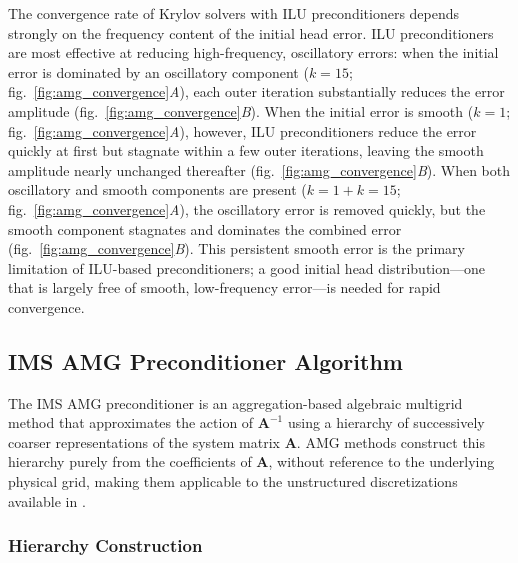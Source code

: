 The convergence rate of Krylov solvers with ILU preconditioners depends strongly on the frequency content of the initial head error. ILU preconditioners are most effective at reducing high-frequency, oscillatory errors: when the initial error is dominated by an oscillatory component ($k = 15$; fig.~\ref{fig:amg_convergence}\textit{A}), each outer iteration substantially reduces the error amplitude (fig.~\ref{fig:amg_convergence}\textit{B}). When the initial error is smooth ($k = 1$; fig.~\ref{fig:amg_convergence}\textit{A}), however, ILU preconditioners reduce the error quickly at first but stagnate within a few outer iterations, leaving the smooth amplitude nearly unchanged thereafter (fig.~\ref{fig:amg_convergence}\textit{B}). When both oscillatory and smooth components are present ($k = 1 + k = 15$; fig.~\ref{fig:amg_convergence}\textit{A}), the oscillatory error is removed quickly, but the smooth component stagnates and dominates the combined error (fig.~\ref{fig:amg_convergence}\textit{B}). This persistent smooth error is the primary limitation of ILU-based preconditioners; a good initial head distribution---one that is largely free of smooth, low-frequency error---is needed for rapid convergence.


\subsection{IMS AMG Preconditioner Algorithm}

The IMS AMG preconditioner is an aggregation-based algebraic multigrid method \citep{notay2010} that approximates the action of $\mathbf{A}^{-1}$ using a hierarchy of successively coarser representations of the system matrix $\mathbf{A}$. AMG methods construct this hierarchy purely from the coefficients of $\mathbf{A}$, without reference to the underlying physical grid, making them applicable to the unstructured discretizations available in \mf.

\subsubsection{Hierarchy Construction}

